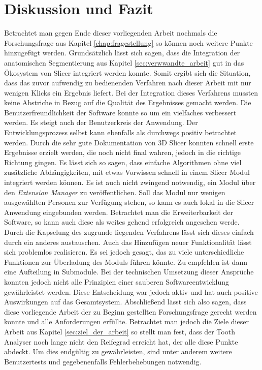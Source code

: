 \chapter{Diskussion und Fazit}
\label{chap:diskussion} Betrachtet man gegen Ende dieser vorliegenden Arbeit nochmals
die Forschungsfrage aus Kapitel \ref{chap:fragestellung} so können noch weitere Punkte
hinzugefügt werden. Grundsätzlich lässt sich sagen, dass die Integration der anatomischen
Segmentierung aus Kapitel \ref{sec:verwwandte_arbeit} gut in das Ökosystem von Slicer
integriert werden konnte. Somit ergibt sich die Situation, dass das zuvor aufwendig
zu bedienenden Verfahren nach dieser Arbeit mit nur wenigen Klicks ein Ergebnis liefert.
Bei der Integration dieses Verfahrens mussten keine Abstriche in Bezug auf die
Qualität des Ergebnisses gemacht werden. Die Benutzerfreundlichkeit der Software
konnte so um ein vielfaches verbessert werden. Es steigt auch der Benutzerkreis
der Anwendung. Der Entwicklungsprozess selbst kann ebenfalls als durchwegs positiv
betrachtet werden. Durch die sehr gute Dokumentation von 3D Slicer konnten
schnell erste Ergebnisse erzielt werden, die noch nicht final wahren, jedoch in
die richtige Richtung gingen. Es lässt sich so sagen, dass einfache Algorithmen
ohne viel zusätzliche Abhängigkeiten, mit etwas Vorwissen schnell in einem Slicer
Modul integriert werden können. Es ist auch nicht zwingend notwendig, ein Modul über
den \textit{Extension Manager} zu veröffentlichen. Soll das Modul nur wenigen ausgewählten
Personen zur Verfügung stehen, so kann es auch lokal in die Slicer Anwendung
eingebunden werden. Betrachtet man die Erweiterbarkeit der Software, so kann
auch diese als weites gehend erfolgreich angesehen werde. Durch die Kapselung des
zugrunde liegenden Verfahrens lässt sich dieses einfach durch ein anderes austauschen.
Auch das Hinzufügen neuer Funktionalität lässt sich problemlos realisieren. Es sei
jedoch gesagt, das zu viele unterschiedliche Funktionen zur Überladung des
Moduls führen könnte. Zu empfehlen ist dann eine Aufteilung in Submodule. Bei
der technischen Umsetzung dieser Ansprüche konnten jedoch nicht alle Prinzipien
einer sauberen Softwareentwicklung gewährleistet werden. Diese Entscheidung war jedoch
aktiv und hat auch positive Auswirkungen auf das Gesamtsystem. Abschließend
lässt sich also sagen, dass diese vorliegende Arbeit der zu Beginn gestellten Forschungsfrage
gerecht werden konnte und alle Anforderungen erfüllte. Betrachtet man jedoch die
Ziele dieser Arbeit aus Kapitel \ref{sec:ziel_der_arbeit} so stellt man fest, dass
der Tooth Analyser noch lange nicht den Reifegrad erreicht hat, der alle diese
Punkte abdeckt. Um dies endgültig zu gewährleisten, sind unter anderem weitere
Benutzertests und gegebenenfalls Fehlerbehebungen notwendig.
